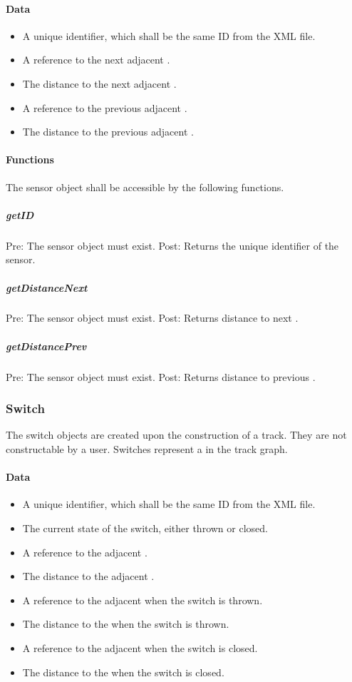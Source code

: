 \documentclass[a4paper,11pt,notitlepage]{article}
\begin{document}
\paragraph{Data}
\begin{itemize}
\item A unique identifier, which shall be the same ID from the XML file.
\item A reference to the next adjacent \TN.
\item The distance to the next adjacent \TN.
\item A reference to the previous adjacent \TN.
\item The distance to the previous adjacent \TN.
\end{itemize}
\paragraph{Functions}
The sensor object shall be accessible by the following functions.
\subparagraph{getID} Pre: The sensor object must exist. Post: Returns the unique identifier of the sensor.
\subparagraph{getDistanceNext} Pre: The sensor object must exist. Post: Returns distance to next \TN.
\subparagraph{getDistancePrev} Pre: The sensor object must exist. Post: Returns distance to previous \TN.

\subsubsection{Switch}
The switch objects are created upon the construction of a track. They are not constructable by a user. Switches represent a \TN in the track graph.
\paragraph{Data}
\begin{itemize}
\item A unique identifier, which shall be the same ID from the XML file.
\item The current state of the switch, either thrown or closed.
\item A reference to the adjacent \TN.
\item The distance to the adjacent \TN.
\item A reference to the adjacent \TN when the switch is thrown.
\item The distance to the \TN when the switch is thrown.
\item A reference to the adjacent \TN when the switch is closed.
\item The distance to the \TN when the switch is closed.
\end{itemize}
\end{document}

